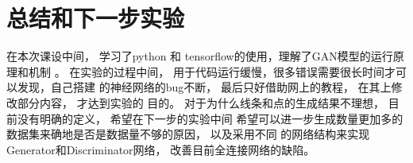 \chapter{总结和下一步实验}
在本次课设中间， 学习了python 和 tensorflow的使用，理解了GAN模型的运行原理和机制
。 在实验的过程中间， 用于代码运行缓慢，很多错误需要很长时间才可以发现，自己搭建
的神经网络的bug不断， 最后只好借助网上的教程， 在其上修改部分内容， 才达到实验的
目的。
对于为什么线条和点的生成结果不理想， 目前没有明确的定义， 希望在下一步的实验中间
希望可以进一步生成数量更加多的数据集来确地是否是数据量不够的原因， 以及采用不同
的网络结构来实现Generator和Discriminator网络， 改善目前全连接网络的缺陷。
